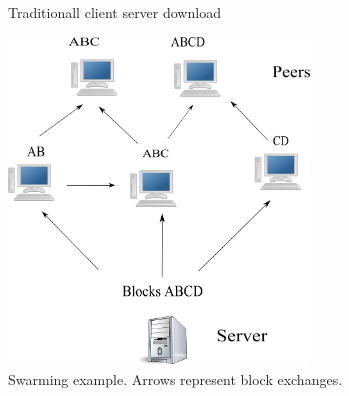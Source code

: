 \begin{figure}
  \caption{Traditionall client server download}
\end{figure}

\begin{figure}
 \centering
 \includegraphics[width=8cm]{description_pics/normal_swarm.png}
 \caption{Swarming example.  Arrows represent block exchanges.}
 \label{fig:normal_swarm}
\end{figure}

